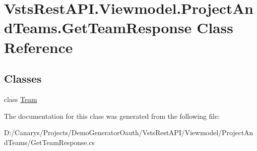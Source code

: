 \hypertarget{class_vsts_rest_a_p_i_1_1_viewmodel_1_1_project_and_teams_1_1_get_team_response}{}\section{Vsts\+Rest\+A\+P\+I.\+Viewmodel.\+Project\+And\+Teams.\+Get\+Team\+Response Class Reference}
\label{class_vsts_rest_a_p_i_1_1_viewmodel_1_1_project_and_teams_1_1_get_team_response}
\subsection*{Classes}
\begin{DoxyCompactItemize}
\item 
class \mbox{\hyperlink{class_vsts_rest_a_p_i_1_1_viewmodel_1_1_project_and_teams_1_1_get_team_response_1_1_team}{Team}}
\end{DoxyCompactItemize}


The documentation for this class was generated from the following file\+:\begin{DoxyCompactItemize}
\item 
D\+:/\+Canarys/\+Projects/\+Demo\+Generator\+Oauth/\+Vsts\+Rest\+A\+P\+I/\+Viewmodel/\+Project\+And\+Teams/Get\+Team\+Response.\+cs\end{DoxyCompactItemize}
